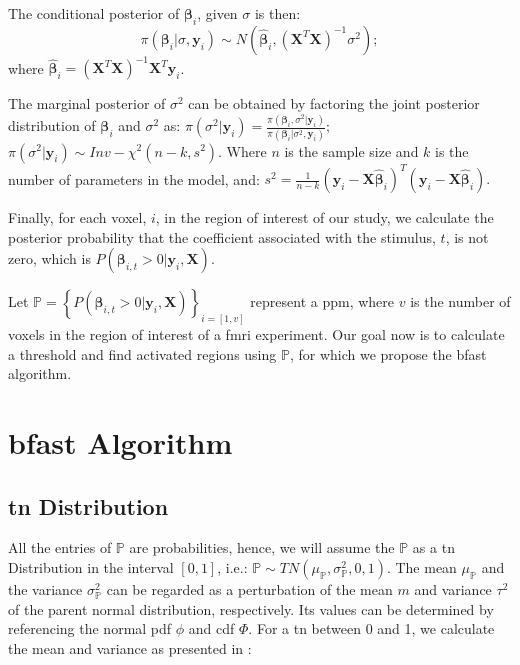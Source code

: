 The conditional posterior of $\bm{\beta}_i$, given $\sigma$ is then:
\begin{equation}
\pi \left( \bm{\beta}_i|\sigma ,\bm{y}_i \right) 
\sim N\left( \bm{\hat{\beta}}_i, 
\left( \bm{X}^T\bm{X} \right)^{-1} \sigma^2 \right);
\end{equation}
where $\bm{\hat{\beta}}_i = \left( \bm{X}^T\bm{X} \right)^{-1}\bm{X}^T \bm{y}_i$.

The marginal posterior of $\sigma^2$ can be obtained by factoring the 
joint posterior distribution of $\bm{\beta}_i$ and $\sigma^2$ as:
$
\pi (\sigma^2|\bm{y}_i) = \frac{\pi \left( \bm{\beta}_i,\sigma^2 
|\bm{y}_i \right)}{\pi \left( \bm{\beta}_i|\sigma^2 ,\bm{y}_i \right)};
$
$
\pi (\sigma^2|\bm{y}_i) \sim Inv- \chi^2(n-k,s^2).
$
Where $n$ is the sample size and $k$ is the number of parameters in the model, and:
$
s^2 = \frac{1}{n-k} \left( \bm{y}_i - \bm{X}\bm{\hat{\beta}}_i \right)^T
 \left( \bm{y}_i - \bm{X}\bm{\hat{\beta}}_i \right).
$

Finally, for each voxel, $i$, in the region of interest of our study, 
we calculate the posterior probability that the coefficient associated with the 
stimulus, $t$, is not zero, which is 
$P(\bm{\beta}_{i,t} > 0 | \bm{y}_i, \bm{X})$.

Let $\bm{\mathbb{P}} = \left\{ P(\bm{\beta}_{i,t} > 0 | \bm{y}_i, \bm{X}) \right\}_{i=[1,v]}$ 
represent a \gls{ppm}, where $v$ is the number of voxels in the region of interest of a \gls{fmri} experiment. 
Our goal now is to calculate a threshold and find activated regions using $\bm{\mathbb{P}}$, 
for which we propose the \gls{bfast} algorithm.

\section{\texorpdfstring{\gls{bfast}}{BFAST} Algorithm}

\subsection{\texorpdfstring{\acrlong{tn}}{Truncated Nornal} Distribution}

All the entries of $\bm{\mathbb{P}}$ are probabilities, hence, we will assume the
$\bm{\mathbb{P}}$ as a \gls{tn} Distribution in the interval $[0,1]$, i.e.:
$
\bm{\mathbb{P}} \sim TN\left( \mu_{\bm{\mathbb{P}}}, \sigma^2_{\bm{\mathbb{P}}}, 0,1 \right).
$
The mean $\mu_{\bm{\mathbb{P}}}$ and the variance $\sigma^2_{\bm{\mathbb{P}}}$ can be 
regarded as a perturbation of the mean $m$ and variance $\tau^2$ of the parent normal 
distribution, respectively. Its values can be determined by referencing the normal
 \gls{pdf} $\phi$ and \gls{cdf} $\Phi$. For a \gls{tn} between 0 and 1, we calculate the mean and variance as
presented in \cite{johnson1995continuous}:

